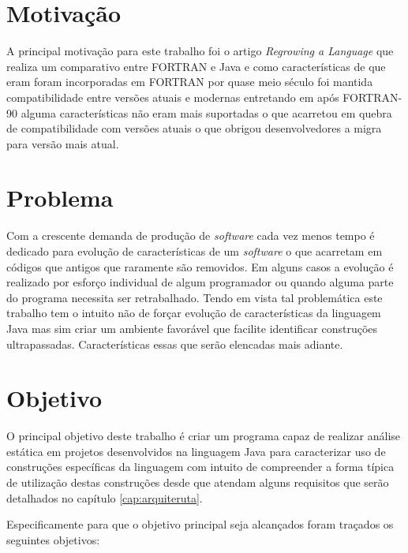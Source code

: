 \section{Motivação}
A principal motivação para este trabalho foi o artigo \textit{Regrowing a Language} \cite{Overbey:2009} que realiza um comparativo entre FORTRAN e Java  e como características de que eram foram incorporadas em FORTRAN por quase meio século foi mantida compatibilidade entre versões atuais e modernas entretando em após FORTRAN-90 alguma características não eram mais suportadas o que acarretou em quebra de compatibilidade com versões atuais o que obrigou desenvolvedores a migra para versão mais atual.
	
\section{Problema}
Com a crescente demanda de produção de \textit{software} cada vez menos tempo é dedicado para evolução de características de um \textit{software} o que acarretam em códigos que antigos que raramente são removidos. Em alguns casos a evolução é realizado por esforço individual de algum programador ou quando alguma parte do programa necessita ser retrabalhado. Tendo em vista tal problemática este trabalho tem o intuito não de forçar evolução de características da linguagem Java mas sim criar um ambiente favorável que facilite identificar construções ultrapassadas. Características essas que serão elencadas mais adiante.

\section{Objetivo}
O principal objetivo deste trabalho é criar um programa capaz de realizar análise estática em projetos desenvolvidos na linguagem Java para caracterizar uso de construções específicas da linguagem com intuito de compreender a forma típica de utilização destas construções desde que atendam alguns requisitos que serão detalhados no capítulo \ref{cap:arquiteruta}.
	
Especificamente para que o objetivo principal seja alcançados foram traçados os seguintes objetivos:

